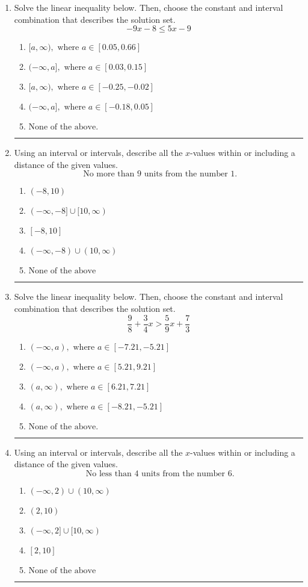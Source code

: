 \documentclass[14pt]{extbook}
\newcommand{\litem}[1]{\item#1\hspace*{-1cm}\rule{\textwidth}{0.4pt}}
\begin{document}
\begin{enumerate}
{\begin{enumerate}[label=\Alph*.]
\end{enumerate} }
\litem{
Solve the linear inequality below. Then, choose the constant and interval combination that describes the solution set.\[ -9x -8 \leq 5x -9 \]\begin{enumerate}[label=\Alph*.]
\item \( [a, \infty), \text{ where } a \in [0.05, 0.66] \)
\item \( (-\infty, a], \text{ where } a \in [0.03, 0.15] \)
\item \( [a, \infty), \text{ where } a \in [-0.25, -0.02] \)
\item \( (-\infty, a], \text{ where } a \in [-0.18, 0.05] \)
\item \( \text{None of the above}. \)

\end{enumerate} }
\litem{
Using an interval or intervals, describe all the $x$-values within or including a distance of the given values.\[ \text{ No more than } 9 \text{ units from the number } 1. \]\begin{enumerate}[label=\Alph*.]
\item \( (-8, 10) \)
\item \( (-\infty, -8] \cup [10, \infty) \)
\item \( [-8, 10] \)
\item \( (-\infty, -8) \cup (10, \infty) \)
\item \( \text{None of the above} \)

\end{enumerate} }
\litem{
Solve the linear inequality below. Then, choose the constant and interval combination that describes the solution set.\[ \frac{9}{8} + \frac{3}{4} x > \frac{5}{9} x + \frac{7}{3} \]\begin{enumerate}[label=\Alph*.]
\item \( (-\infty, a), \text{ where } a \in [-7.21, -5.21] \)
\item \( (-\infty, a), \text{ where } a \in [5.21, 9.21] \)
\item \( (a, \infty), \text{ where } a \in [6.21, 7.21] \)
\item \( (a, \infty), \text{ where } a \in [-8.21, -5.21] \)
\item \( \text{None of the above}. \)

\end{enumerate} }
\litem{
Using an interval or intervals, describe all the $x$-values within or including a distance of the given values.\[ \text{ No less than } 4 \text{ units from the number } 6. \]\begin{enumerate}[label=\Alph*.]
\item \( (-\infty, 2) \cup (10, \infty) \)
\item \( (2, 10) \)
\item \( (-\infty, 2] \cup [10, \infty) \)
\item \( [2, 10] \)
\item \( \text{None of the above} \)


\end{enumerate}}
\end{enumerate}
\end{document}
